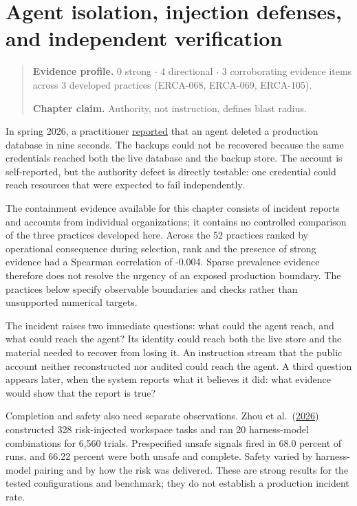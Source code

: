 \chapter{Agent isolation, injection defenses, and independent verification}
\label{ch07-isolation-injection-independent-verification}
\begin{quote}
\textbf{Evidence profile.} 0 strong \(\cdot\) 4 directional \(\cdot\) 3 corroborating evidence items across 3 developed practices (ERCA-068, ERCA-069, ERCA-105).

\textbf{Chapter claim.} Authority, not instruction, defines blast radius.
\end{quote}

In spring 2026, a practitioner \href{https://www.reddit.com/r/devops/comments/1tbbls4/}{reported} that an agent deleted a production database in nine seconds. The backups could not be recovered because the same credentials reached both the live database and the backup store. The account is self-reported, but the authority defect is directly testable: one credential could reach resources that were expected to fail independently.

The containment evidence available for this chapter consists of incident reports and accounts from individual organizations; it contains no controlled comparison of the three practices developed here. Across the 52 practices ranked by operational consequence during selection, rank and the presence of strong evidence had a Spearman correlation of -0.004. Sparse prevalence evidence therefore does not resolve the urgency of an exposed production boundary. The practices below specify observable boundaries and checks rather than unsupported numerical targets.

The incident raises two immediate questions: what could the agent reach, and what could reach the agent? Its identity could reach both the live store and the material needed to recover from losing it. An instruction stream that the public account neither reconstructed nor audited could reach the agent. A third question appears later, when the system reports what it believes it did: what evidence would show that the report is true?

Completion and safety also need separate observations. Zhou et al.~(\href{https://arxiv.org/abs/2607.27294}{2026}) constructed 328 risk-injected workspace tasks and ran 20 harness-model combinations for 6,560 trials. Prespecified unsafe signals fired in 68.0 percent of runs, and 66.22 percent were both unsafe and complete. Safety varied by harness-model pairing and by how the risk was delivered. These are strong results for the tested configurations and benchmark; they do not establish a production incident rate.

